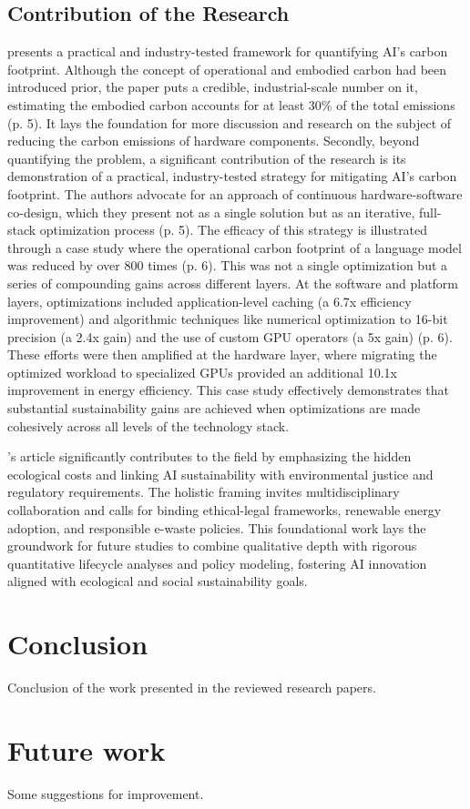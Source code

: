 \documentclass[a4paper, 12pt]{article}
\begin{document}
\subsection{Contribution of the Research}
\hspace{24pt}\citet{Wu2022} presents a practical and industry-tested framework for quantifying AI's carbon footprint. Although the concept of operational and embodied carbon had been introduced prior, the paper puts a credible, industrial-scale number on it, estimating the embodied carbon accounts for at least 30\% of the total emissions (p. 5). It lays the foundation for more discussion and research on the subject of reducing the carbon emissions of hardware components. Secondly, beyond quantifying the problem, a significant contribution of the research is its demonstration of a practical, industry-tested strategy for mitigating AI's carbon footprint. The authors advocate for an approach of continuous hardware-software co-design, which they present not as a single solution but as an iterative, full-stack optimization process (p. 5). The efficacy of this strategy is illustrated through a case study where the operational carbon footprint of a language model was reduced by over 800 times (p. 6). This was not a single optimization but a series of compounding gains across different layers. At the software and platform layers, optimizations included application-level caching (a 6.7x efficiency improvement) and algorithmic techniques like numerical optimization to 16-bit precision (a 2.4x gain) and the use of custom GPU operators (a 5x gain) (p. 6). These efforts were then amplified at the hardware layer, where migrating the optimized workload to specialized GPUs provided an additional 10.1x improvement in energy efficiency. This case study effectively demonstrates that substantial sustainability gains are achieved when optimizations are made cohesively across all levels of the technology stack.

\hspace{24pt} \citet{Zhuk2023}'s article significantly contributes to the field by emphasizing the hidden ecological costs and linking AI sustainability with environmental justice and regulatory requirements. The holistic framing invites multidisciplinary collaboration and calls for binding ethical-legal frameworks, renewable energy adoption, and responsible e-waste policies. This foundational work lays the groundwork for future studies to combine qualitative depth with rigorous quantitative lifecycle analyses and policy modeling, fostering AI innovation aligned with ecological and social sustainability goals.

\section{Conclusion}
Conclusion of the work presented in the reviewed research papers.

\section{Future work}
Some suggestions for improvement.

\printbibliography
\end{document}
